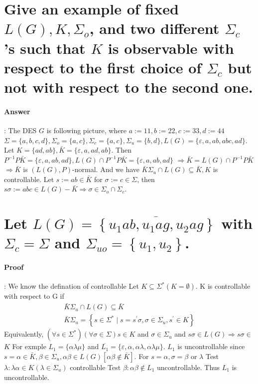 \documentclass{article}
\begin{document}
\section{Give an example of fixed $L(G), K, \Sigma_o$, and two different $\Sigma_c$ 's such that $K$ is observable with respect to the first choice of $\Sigma_c$ but not with respect to the second one.}

\paragraph{Answer}:
The DES $G$ is following picture, where $a:=11, b:=22, c:=33, d:=44$ $\Sigma=\{a, b, c, d\}, \Sigma_o=\{a, c\}, \Sigma_c=\{a, c\}, \Sigma_u=\{b, d\}, L(G)=\{\varepsilon, a, a b, a b c, a d\}$. Let $K=\{a d, a b\}, \bar{K}=\{\varepsilon, a, a d, a b\}$.
Then $P^{-1} P \bar{K}=\{\varepsilon, a, a b, a d\}, L(G) \cap P^{-1} P \bar{K}=\{\varepsilon, a, a b, a d\}$
$\Longrightarrow \bar{K}=L(G) \cap P^{-1} P \bar{K}$
$\Longrightarrow \bar{K}$ is $(L(G), P)$-normal.
And we have $\bar{K} \Sigma_u \cap L(G) \subseteq \bar{K}, K$ is controllable. Let $s:=a b \in \bar{K}$ for $\sigma:=c \in \Sigma$, then $s \sigma:=a b c \in L(G)-\bar{K} \Longrightarrow \sigma \in \Sigma_o \cap \Sigma_c$.

\section{ Let $L(G)=\overline{\left\{u_1 a b, u_1 a g, u_2 a g\right\}}$ with  $\Sigma_c=\Sigma $ and $ \Sigma_{u o}=\left\{u_1, u_2\right\} $.}

\paragraph{Proof}:
We know the defination of controllable Let $K \subseteq \Sigma^*(K=\emptyset)$. $\mathrm{K}$ is controllable with respect to $\mathrm{G}$ if
$$
\begin{array}{r}
\bar{K} \Sigma_u \cap L(G) \subseteq \bar{K} \\
\bar{K} \Sigma_u=\left\{s \in \Sigma^* \mid s=s^{\prime} \sigma, \sigma \in \Sigma_u, s^{\prime} \in K\right\}
\end{array}
$$
Equivalently, $\left(\forall s \in \Sigma^*\right)(\forall \sigma \in \Sigma) s \in K$ and $\sigma \in \Sigma_u$ and $s \sigma \in L(G) \Rightarrow s \sigma \in$
$K$
For exmple $L_1=\{\alpha \lambda \mu\}$ and $\overline{L_1}=\{\varepsilon, \alpha, \alpha \lambda, \alpha \lambda \mu\}$. $L_1$ is uncontrollable since $s=\alpha \in \bar{K}, \beta \in \Sigma_u, \alpha \beta \in L(G)[\alpha \beta \notin \bar{K}]$. For $s=\alpha, \sigma=\beta$ or $\lambda$
Test $\lambda: \lambda \alpha \in K\left(\lambda \in \Sigma_u\right)$ controllable
Test $\beta: \alpha \beta \notin L_1$ uncontrollable. Thus $L_1$ is uncontrollable.
\end{document}
